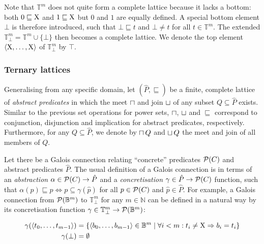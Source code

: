 

Note that $\mathbb{T}^{m}$ does not quite form a complete lattice because it lacks a bottom: both $0 \sqsubseteq \mathrm{X}$ and $1 \sqsubseteq \mathrm{X}$ but $0$ and $1$ are equally defined. A special bottom element $\bot$ is therefore introduced, such that $\bot \sqsubseteq t$ and $\bot \neq t$ for all $t \in \mathbb{T}^{m}$. The extended $\mathbb{T}_{\bot}^{m} = \mathbb{T}^{m} \cup \{ \bot \}$ then becomes a complete lattice. We denote the top element $\langle \mathrm{X}, \dots, \mathrm{X} \rangle$ of $\mathbb{T}_{\bot}^{m}$ by $\top$.

\subsubsection{Ternary lattices}

Generalising from any specific domain, let $(\hat P,\sqsubseteq)$ be a finite, complete lattice of \textit{abstract predicates} in which the meet $\operatorname{\sqcap}$ and join $\operatorname{\sqcup}$ of any subset $Q \subseteq \hat P$ exists. Similar to the previous set operations for power sets, $\operatorname{\sqcap}$, $\operatorname{\sqcup}$ and $\sqsubseteq$ correspond to conjunction, disjunction and implication for abstract predicates, respectively. Furthermore, for any $Q \subseteq \hat P$, we denote by $\operatorname{\sqcap} Q$ and $\operatorname{\sqcup} Q$ the meet and join of all members of $Q$.

Let there be a Galois connection relating ``concrete'' predicates $\mathcal{P}(C)$ and abstract predicates $\hat P$. The usual definition of a Galois connection is in terms of an \textit{abstraction} $\alpha \in \mathcal{P}(C) \rightarrow \hat P$ and a \textit{concretisation} $\gamma \in \hat P \rightarrow \mathcal{P}(C)$ function, such that $\alpha(p) \sqsubseteq \hat p \iff p \subseteq \gamma(\hat p)$ for all $p \in \mathcal{P}(C)$ and $\hat p \in \hat P$. For example, a Galois connection from $\mathcal{P}(\mathbb{B}^{m})$ to $\mathbb{T}_{\bot}^{m}$ for any $m \in \mathbb{N}$ can be defined in a natural way by its concretisation function $\gamma \in \mathbb{T}_{\bot}^{m} \rightarrow \mathcal{P}(\mathbb{B}^{m})$:

\begin{align*}
\gamma ( \langle t_{0}, \dots,t_{m-1} \rangle ) &= \{ \langle b_{0}, \dots,b_{m-1} \rangle \in \mathbb{B}^{m} \mid \forall i < m : t_{i} \neq \mathrm{X} \Rightarrow b_{i} = t_{i} \} \\
\gamma ( \bot ) &= \emptyset
\end{align*}

